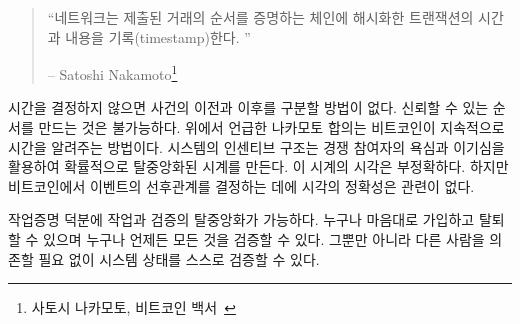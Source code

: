 \begin{quotation}\begin{samepage}
\enquote{네트워크는 제출된 거래의 순서를 증명하는 체인에 해시화한 트랜잭션의 시간과 내용을 기록(timestamp)한다. }
\begin{flushright} -- Satoshi Nakamoto\footnote{사토시 나카모토, 비트코인 백서~\cite{whitepaper}}
\end{flushright}\end{samepage}\end{quotation}

\begin{comment}
Without a consistent way to tell the time, there is no consistent way to
tell before from after. Reliable ordering is impossible. As mentioned
above, Nakamoto consensus is Bitcoin's way to consistently tell the
time. The system's incentive structure produces a probabilistic,
decentralized clock, by utilizing both greed and self-interest of
competing participants. The fact that this clock is imprecise is
irrelevant because the order of events is eventually unambiguous and can
be verified by anyone.
\end{comment}
시간을 결정하지 않으면 사건의 이전과 이후를 구분할 방법이 없다.
신뢰할 수 있는 순서를 만드는 것은 불가능하다.
위에서 언급한 나카모토 합의는 비트코인이 지속적으로 시간을 알려주는 방법이다.
시스템의 인센티브 구조는 경쟁 참여자의 욕심과 이기심을 활용하여 확률적으로 탈중앙화된 시계를 만든다.
이 시계의 시각은 부정확하다. 
하지만 비트코인에서 이벤트의 선후관계를 결정하는 데에 시각의 정확성은 관련이 없다.

\begin{comment}
Thanks to proof-of-work, both the work \textit{and} the validation of the work
are radically decentralized. Everyone can join and leave at will, and
everyone can validate everything at all times. Not only that, but
everyone can validate the state of the system \textit{individually}, without
having to rely on anyone else for validation.
\end{comment}
작업증명 덕분에 작업과 검증의 탈중앙화가 가능하다.
누구나 마음대로 가입하고 탈퇴할 수 있으며 누구나 언제든 모든 것을 검증할 수 있다.
그뿐만 아니라 다른 사람을 의존할 필요 없이 시스템 상태를 스스로 검증할 수 있다.


